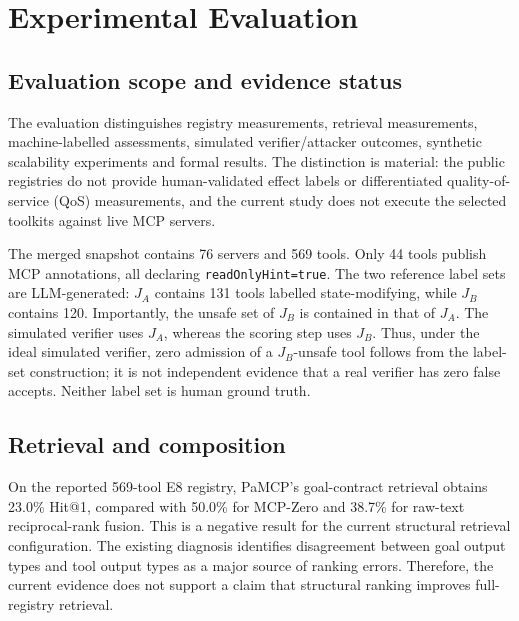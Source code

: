 \section{Experimental Evaluation}
\label{sec:ev-revision}

\subsection{Evaluation scope and evidence status}

The evaluation distinguishes registry measurements, retrieval measurements, machine-labelled assessments,
simulated verifier/attacker outcomes, synthetic scalability experiments and formal results. The distinction is
material: the public registries do not provide human-validated effect labels or differentiated quality-of-service
(QoS) measurements, and the current study does not execute the selected toolkits against live MCP servers.

The merged snapshot contains 76 servers and 569 tools. Only 44 tools publish MCP annotations, all declaring
\texttt{readOnlyHint=true}. The two reference label sets are LLM-generated: \(J_A\) contains 131 tools labelled
state-modifying, while \(J_B\) contains 120. Importantly, the unsafe set of \(J_B\) is contained in that of \(J_A\).
The simulated verifier uses \(J_A\), whereas the scoring step uses \(J_B\). Thus, under the ideal simulated verifier,
zero admission of a \(J_B\)-unsafe tool follows from the label-set construction; it is not independent evidence that
a real verifier has zero false accepts. Neither label set is human ground truth.

\subsection{Retrieval and composition}

On the reported 569-tool E8 registry, PaMCP's goal-contract retrieval obtains 23.0\% Hit@1, compared with
50.0\% for MCP-Zero and 38.7\% for raw-text reciprocal-rank fusion. This is a negative result for the current
structural retrieval configuration. The existing diagnosis identifies disagreement between goal output types and
tool output types as a major source of ranking errors. Therefore, the current evidence does not support a claim
that structural ranking improves full-registry retrieval.

